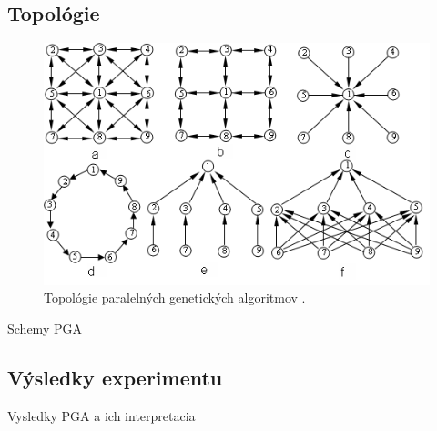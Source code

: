 \subsection{Topológie}

\begin{figure}[!htbp]
  \centering
  \includegraphics[width=\textwidth]{img/topology.png}
  \caption{Topológie paralelných genetických algoritmov \cite{pea}.}
  \label{img:topology}
\end{figure}

Schemy PGA
\subsection{Výsledky experimentu}
Vysledky PGA a ich interpretacia


